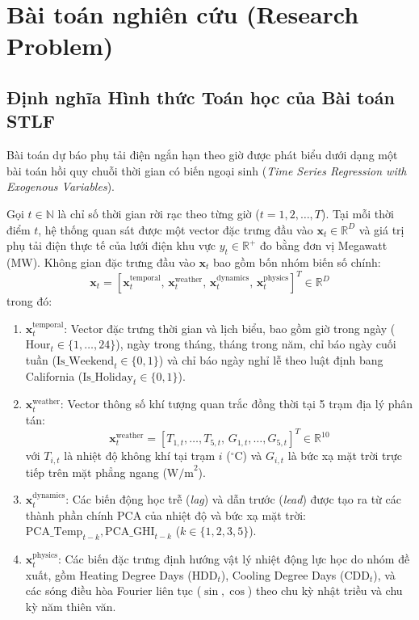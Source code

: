 \section{Bài toán nghiên cứu (Research Problem)}
\label{sec:research_problem}

\subsection{Định nghĩa Hình thức Toán học của Bài toán STLF}
Bài toán dự báo phụ tải điện ngắn hạn theo giờ được phát biểu dưới dạng một bài toán hồi quy chuỗi thời gian có biến ngoại sinh (\textit{Time Series Regression with Exogenous Variables}). 

Gọi $t \in \mathbb{N}$ là chỉ số thời gian rời rạc theo từng giờ ($t = 1, 2, \dots, T$). Tại mỗi thời điểm $t$, hệ thống quan sát được một vector đặc trưng đầu vào $\mathbf{x}_t \in \mathbb{R}^D$ và giá trị phụ tải điện thực tế của lưới điện khu vực $y_t \in \mathbb{R}^+$ đo bằng đơn vị Megawatt (MW). Không gian đặc trưng đầu vào $\mathbf{x}_t$ bao gồm bốn nhóm biến số chính:
\begin{equation}
    \mathbf{x}_t = \left[ \mathbf{x}_t^{\text{temporal}}, \, \mathbf{x}_t^{\text{weather}}, \, \mathbf{x}_t^{\text{dynamics}}, \, \mathbf{x}_t^{\text{physics}} \right]^T \in \mathbb{R}^D
\end{equation}
trong đó:
\begin{enumerate}
    \item $\mathbf{x}_t^{\text{temporal}}$: Vector đặc trưng thời gian và lịch biểu, bao gồm giờ trong ngày ($\text{Hour}_t \in \{1, \dots, 24\}$), ngày trong tháng, tháng trong năm, chỉ báo ngày cuối tuần ($\text{Is\_Weekend}_t \in \{0, 1\}$) và chỉ báo ngày nghỉ lễ theo luật định bang California ($\text{Is\_Holiday}_t \in \{0, 1\}$).
    \item $\mathbf{x}_t^{\text{weather}}$: Vector thông số khí tượng quan trắc đồng thời tại 5 trạm địa lý phân tán:
    \begin{equation}
        \mathbf{x}_t^{\text{weather}} = \left[ T_{1, t}, \dots, T_{5, t}, \, G_{1, t}, \dots, G_{5, t} \right]^T \in \mathbb{R}^{10}
    \end{equation}
    với $T_{i, t}$ là nhiệt độ không khí tại trạm $i$ ($^\circ\text{C}$) và $G_{i, t}$ là bức xạ mặt trời trực tiếp trên mặt phẳng ngang ($\text{W/m}^2$).
    \item $\mathbf{x}_t^{\text{dynamics}}$: Các biến động học trễ (\textit{lag}) và dẫn trước (\textit{lead}) được tạo ra từ các thành phần chính PCA của nhiệt độ và bức xạ mặt trời: $\text{PCA\_Temp}_{t-k}, \text{PCA\_GHI}_{t-k}$ ($k \in \{1, 2, 3, 5\}$).
    \item $\mathbf{x}_t^{\text{physics}}$: Các biến đặc trưng định hướng vật lý nhiệt động lực học do nhóm đề xuất, gồm Heating Degree Days ($\text{HDD}_t$), Cooling Degree Days ($\text{CDD}_t$), và các sóng điều hòa Fourier liên tục ($\sin, \cos$) theo chu kỳ nhật triều và chu kỳ năm thiên văn.
\end{enumerate}

